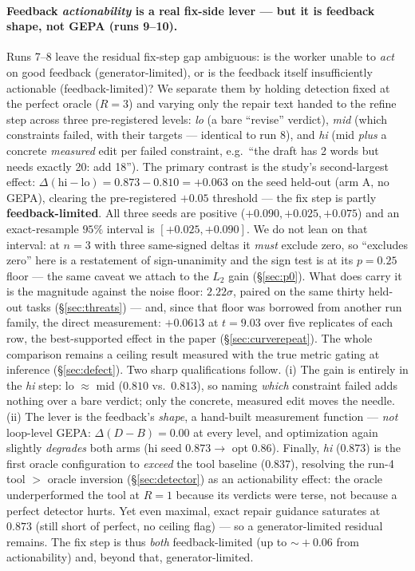 \documentclass[11pt]{article}
\newcommand{\dd}{\ensuremath{\Delta}}
\begin{document}
\paragraph{Feedback \emph{actionability} is a real fix-side lever --- but it is feedback
shape, not GEPA (runs 9--10).} Runs 7--8 leave the residual fix-step gap ambiguous: is
the worker unable to \emph{act} on good feedback (generator-limited), or is the feedback
itself insufficiently actionable (feedback-limited)? We separate them by holding detection
fixed at the perfect oracle ($R{=}3$) and varying only the repair text handed to the refine
step across three pre-registered levels: \emph{lo} (a bare ``revise'' verdict), \emph{mid}
(which constraints failed, with their targets --- identical to run 8), and \emph{hi} (mid
\emph{plus} a concrete \emph{measured} edit per failed constraint, e.g.\ ``the draft has 2
words but needs exactly 20: add 18''). The primary contrast is the study's second-largest
effect: $\dd(\text{hi}-\text{lo}) = 0.873 - 0.810 = +0.063$ on the seed held-out (arm A, no
GEPA), clearing the pre-registered $+0.05$ threshold --- the fix step is partly
\textbf{feedback-limited}. All three seeds are positive ($+0.090, +0.025, +0.075$) and an
exact-resample $95\%$ interval is $[+0.025, +0.090]$. We do not lean on that interval:
at $n{=}3$ with three same-signed deltas it \emph{must} exclude zero, so ``excludes zero'' here
is a restatement of sign-unanimity and the sign test is at its $p=0.25$ floor --- the same
caveat we attach to the $L_2$ gain (\S\ref{sec:p0}). What does carry it is the magnitude
against the noise floor: $2.22\sigma$, paired on the same thirty held-out tasks
(\S\ref{sec:threats}) --- and, since that floor was borrowed from another run family, the direct
measurement: $+0.0613$ at $t = 9.03$ over five replicates of each row, the best-supported effect
in the paper (\S\ref{sec:curverepeat}). The whole comparison remains a ceiling result measured with the
true metric gating at inference (\S\ref{sec:defect}). Two
sharp qualifications follow. (i) The gain is entirely in the \emph{hi} step: lo $\approx$
mid ($0.810$ vs.\ $0.813$), so naming \emph{which} constraint failed adds nothing over a
bare verdict; only the concrete, measured edit moves the needle. (ii) The lever is the
feedback's \emph{shape}, a hand-built measurement function --- \emph{not} loop-level GEPA:
$\dd(D-B)=0.00$ at every level, and optimization again slightly \emph{degrades} both arms
(hi seed $0.873 \to$ opt $0.86$). Finally, \emph{hi} ($0.873$) is the first oracle
configuration to \emph{exceed} the tool baseline ($0.837$), resolving the run-4 tool
$>$ oracle inversion (\S\ref{sec:detector}) as an actionability effect: the oracle
underperformed the tool at $R{=}1$ because its verdicts were terse, not because a perfect
detector hurts. Yet even maximal, exact repair guidance saturates at $0.873$ (still short of
perfect, no ceiling flag) --- so a generator-limited residual remains. The fix step is thus
\emph{both} feedback-limited (up to $\sim\!+0.06$ from actionability) and, beyond that,
generator-limited.
\end{document}
